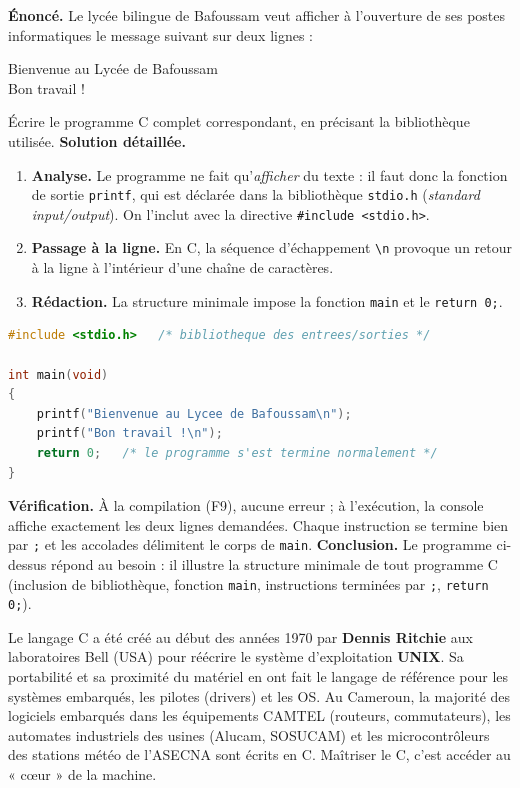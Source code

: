 \documentclass[11pt]{article}
\begin{document}
\begin{exoresolu}
\textbf{Énoncé.} Le lycée bilingue de Bafoussam veut afficher à l'ouverture de ses postes informatiques le message suivant sur deux lignes :
\begin{center}
Bienvenue au Lycée de Bafoussam\\
Bon travail !
\end{center}
Écrire le programme C complet correspondant, en précisant la bibliothèque utilisée.
\tcblower
\textbf{Solution détaillée.}
\begin{enumerate}
\item \textbf{Analyse.} Le programme ne fait qu'\emph{afficher} du texte : il faut donc la fonction de sortie \texttt{printf}, qui est déclarée dans la bibliothèque \texttt{stdio.h} (\emph{standard input/output}). On l'inclut avec la directive \texttt{\#include <stdio.h>}.
\item \textbf{Passage à la ligne.} En C, la séquence d'échappement \texttt{\textbackslash n} provoque un retour à la ligne à l'intérieur d'une chaîne de caractères.
\item \textbf{Rédaction.} La structure minimale impose la fonction \texttt{main} et le \texttt{return 0;}.
\end{enumerate}
\begin{lstlisting}[language=C]
#include <stdio.h>   /* bibliotheque des entrees/sorties */

int main(void)
{
    printf("Bienvenue au Lycee de Bafoussam\n");
    printf("Bon travail !\n");
    return 0;   /* le programme s'est termine normalement */
}
\end{lstlisting}
\textbf{Vérification.} À la compilation (F9), aucune erreur ; à l'exécution, la console affiche exactement les deux lignes demandées. Chaque instruction se termine bien par \texttt{;} et les accolades délimitent le corps de \texttt{main}.
\textbf{Conclusion.} Le programme ci-dessus répond au besoin : il illustre la structure minimale de tout programme C (inclusion de bibliothèque, fonction \texttt{main}, instructions terminées par \texttt{;}, \texttt{return 0;}).
\end{exoresolu}

\begin{savaistu}
Le langage C a été créé au début des années 1970 par \textbf{Dennis Ritchie} aux laboratoires Bell (USA) pour réécrire le système d'exploitation \textbf{UNIX}. Sa portabilité et sa proximité du matériel en ont fait le langage de référence pour les systèmes embarqués, les pilotes (drivers) et les OS. Au Cameroun, la majorité des logiciels embarqués dans les équipements CAMTEL (routeurs, commutateurs), les automates industriels des usines (Alucam, SOSUCAM) et les microcontrôleurs des stations météo de l'ASECNA sont écrits en C. Maîtriser le C, c'est accéder au « cœur » de la machine.
\end{savaistu}
\end{document}
